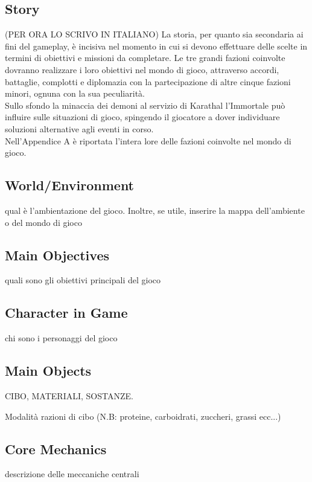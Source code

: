 \documentclass[a4paper]{scrreprt}
\begin{document}
\subsection{Story}
(PER ORA LO SCRIVO IN ITALIANO) La storia, per quanto sia secondaria ai fini del gameplay, è incisiva nel momento in cui si devono effettuare delle scelte in termini di obiettivi e missioni da completare. Le tre grandi fazioni coinvolte dovranno realizzare i loro obiettivi nel mondo di gioco, attraverso accordi, battaglie, complotti e diplomazia con la partecipazione di altre cinque fazioni minori, ognuna con la sua peculiarità.\\
Sullo sfondo la minaccia dei demoni al servizio di Karathal l'Immortale può influire sulle situazioni di gioco, spingendo il giocatore a dover individuare soluzioni alternative agli eventi in corso.\\
Nell'Appendice A è riportata l'intera lore delle fazioni coinvolte nel mondo di gioco.

\subsection{World/Environment}
qual è l'ambientazione del gioco. Inoltre, se utile, inserire la mappa dell'ambiente o del mondo di gioco

\subsection{Main Objectives}
quali sono gli obiettivi principali del gioco

\subsection{Character in Game}
chi sono i personaggi del gioco

\subsection{Main Objects}
CIBO, MATERIALI, SOSTANZE.

Modalità razioni di cibo (N.B: proteine, carboidrati, zuccheri, grassi ecc...)

\subsection{Core Mechanics}
descrizione delle meccaniche centrali

\end{document}
